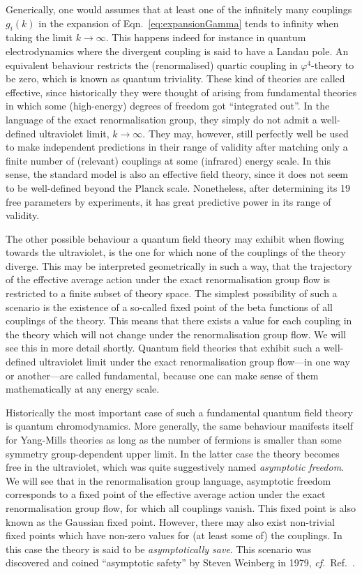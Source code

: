 \documentclass[11pt]{book}
\newcommand\cf{\textit{cf.}\ }
\numberwithin{equation}{chapter}
\begin{document}
Generically, one would assumes that at least one of the infinitely
many couplings $g_i(k)$ in the expansion of
Eqn.~\eqref{eq:expansionGamma} tends to infinity when taking
the limit $k \rightarrow \infty$. This happens indeed for instance
in quantum electrodynamics where the divergent coupling is said to have a
Landau pole. An equivalent behaviour restricts the
(renormalised) quartic coupling in $\varphi^4$-theory to be zero,
which is known as quantum triviality. These kind of theories
are called effective, since historically they were thought of
arising from fundamental theories in which some (high-energy)
degrees of freedom got ``integrated out''. In the language of the
exact renormalisation group, they simply do not admit a
well-defined ultraviolet limit, $k \rightarrow \infty$.
They may, however, still perfectly well be used to make
independent predictions in their range of validity
after matching only a finite number of (relevant) couplings
at some (infrared) energy scale.
In this sense, the standard model is also an effective field
theory, since it does not seem to be well-defined beyond the
Planck scale. Nonetheless, after determining its 19 free
parameters by experiments, it has great predictive power in
its range of validity.

The other possible behaviour a quantum field theory
may exhibit when flowing towards the ultraviolet,
is the one for which none of the couplings of the theory
diverge. This may be interpreted geometrically in such a way,
that the trajectory
of the effective average action under the exact renormalisation
group flow is restricted to a finite subset of theory space.
The simplest possibility of such a scenario is the existence
of a so-called fixed point of the beta functions of all couplings
of the theory. This means that there exists a value
for each coupling in the theory which will not
change under the renormalisation group flow.
We will see this in more detail shortly. Quantum field
theories that exhibit such a well-defined ultraviolet
limit under the exact renormalisation group flow---in one way or
another---are called fundamental, because one can make sense of
them mathematically at any energy scale.

Historically the most important case of such a fundamental quantum
field theory is quantum chromodynamics. More generally,
the same behaviour manifests itself for Yang-Mills theories as long as the
number of fermions is smaller than some symmetry group-dependent
upper limit. In the latter case the theory becomes free
in the ultraviolet, which was quite suggestively named
\textit{asymptotic freedom}. We will see that
in the renormalisation group language,
asymptotic freedom corresponds to a fixed
point of the effective average action
under the exact renormalisation group flow,
for which all couplings vanish.
This fixed point is also known as the Gaussian fixed point.
However, there may also exist non-trivial fixed points
which have non-zero values for (at least some of) the couplings.
In this case the theory is said to be \textit{asymptotically save}.
This scenario was discovered and coined ``asymptotic safety''
by Steven Weinberg in 1979, \cf Ref.~\cite{Weinberg:1980gg}.
\end{document}
